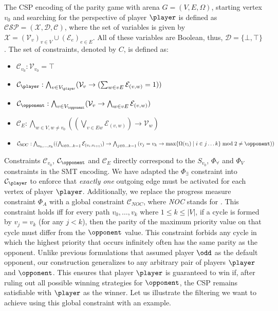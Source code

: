 \documentclass[runningheads]{llncs}
\begin{document}
\begin{definition}\label{def:csp}
    The CSP encoding of the parity game with arena $G=(V,E,\Omega)$, starting vertex $v_0$ and searching for the perspective of player $\player$ is defined as $\mathcal{CSP = (X, D, C)}$, where the set of variables is given by $\mathcal{X} = (\mathcal{V}_v)_{v \in V} \cup (\mathcal{E}_e)_{e \in E}$. All of these variables are Boolean, thus, $\mathcal{D} = \{\bot,\top\}$. The set of constraints, denoted by $C$, is defined as:
    \begin{itemize}
        \item $\mathcal{C}_{v_0} : \mathcal{V}_{v_0} = \top$
        \item $\mathcal{C}_{\player} : \bigwedge_{v \in V_{\player}} (\mathcal{V}_v \rightarrow (\sum_{w \in vE} \mathcal{E}_{(v,w)}= 1))$
        \item $\mathcal{C}_{\opponent} : \bigwedge_{v \in V_{\opponent}} (\mathcal{V}_v \rightarrow \bigwedge_{w \in vE} \mathcal{E}_{(v,w)})$
        \item $\mathcal{C}_{\!E} : \bigwedge_{w \in V, w \neq v_0} ((\bigvee_{v \in Ew} \mathcal{E}_{(v,w)}) \rightarrow \mathcal{V}_w)$
        \item $\mathcal{C}_{\!N\!O\!C} : \bigwedge_{v_0, \dots, v_k} ((\bigwedge_{i\in 0\dots k-1} \mathcal{E}_{(v_i,v_{i+1})}) \rightarrow \bigwedge_{j\in 0\dots k-1}\\ (v_j=v_k \rightarrow \max\{\Omega(v_i) \mid i\in j\dots k\} \bmod 2 \ne \opponent))$
    \end{itemize}
\end{definition}

Constraints $\mathcal{C}_{v_0}$, $\mathcal{C}_{\opponent}$ and $\mathcal{C}_{\!E}$ directly correspond to the $S_{v_0}$, $\Phi_\forall$ and $\Phi_V$ constraints in the SMT encoding. We have adapted the $\Phi_\exists$ constraint into $\mathcal{C}_{\player}$ to enforce that \emph{exactly one} outgoing edge must be activated for each vertex of player $\player$. Additionally, we replace the progress measure constraint $\Phi_A$ with a global constraint $\mathcal{C}_{\!N\!O\!C}$, where \textit{NOC} stands for \noc. This constraint holds iff for every path $v_0,\ldots,v_k$ where $1\leq k\leq |V|$, if a cycle is formed by $v_j = v_k$ (for any $j < k$), then the parity of the maximum  priority value on that cycle must differ from the $\opponent$ value. This constraint forbids any cycle in which the highest priority that occurs infinitely often has the same parity as the opponent. Unlike previous formulations that assumed player $\odd$ as the default opponent, our construction generalizes to any arbitrary pair of players $\player$ and $\opponent$. This ensures that player $\player$ is guaranteed to win if, after ruling out all possible winning strategies for $\opponent$, the CSP remains satisfiable with $\player$ as the winner.
%
Let us illustrate the filtering we want to achieve using this global constraint with an example.
\end{document}
